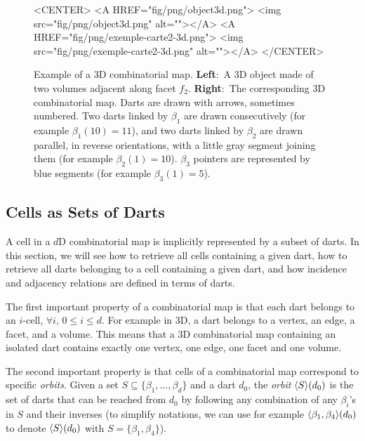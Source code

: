 \begin{figure}
\begin{ccHtmlOnly}
    <CENTER>
    <A HREF="fig/png/object3d.png">
    <img src="fig/png/object3d.png" alt=""></A>
    <A HREF="fig/png/exemple-carte2-3d.png">
        <img src="fig/png/exemple-carte2-3d.png" alt=""></A>
    </CENTER>
    \end{ccHtmlOnly}
    \caption{Example of a 3D combinatorial map. \textbf{Left}:~A 3D object
      made of two volumes adjacent along facet $f_2$. \textbf{Right}:~The
      corresponding 3D combinatorial map.  Darts are drawn with
      arrows, sometimes numbered.  Two darts linked by $\beta_1$ are
      drawn consecutively (for example $\beta_1(10)=11$), and two
      darts linked by $\beta_2$ are drawn parallel, in reverse
      orientations, with a little gray segment joining them (for
      example $\beta_2(1)=10$).  $\beta_3$ pointers are represented by
      blue segments (for example $\beta_3(1)=5$).}
    \label{fig-exemple-carte3d}
\end{figure}

\subsection{Cells as Sets of Darts}\label{ssec-cells-in-map}
A cell in a $d$D combinatorial map is implicitly represented by a
subset of darts.
In this section, we will see how to retrieve all cells containing a
given dart, how to retrieve all darts belonging to a cell containing a
given dart, and how incidence and adjacency relations are defined in
terms of darts.

The first important property of a combinatorial map is that
each dart belongs to an $i$-cell, $\forall i$, $0 \leq i \leq d$.
For example in 3D, a dart belongs to a vertex, an edge, a facet, and a
volume. This means that a 3D combinatorial map containing an isolated
dart contains exactly one vertex, one edge, one facet and one volume.


The second important property is that cells of a combinatorial map
correspond to specific \emph{orbits}.  Given a set 
$S \subseteq \{\beta_1,\ldots,\beta_d\}$ and a dart
$d_0$, the \emph{orbit} $\langle{}S\rangle{}(d_0)$ is the set of darts that can be
reached from $d_0$ by following any combination of any $\beta_i$'s in $S$
and their inverses (to simplify notations, we can use for example
$\langle{}\beta_1,\beta_4\rangle{}(d_0)$ to denote $\langle{}S\rangle{}(d_0)$ with
$S=\{\beta_1,\beta_4\}$).

